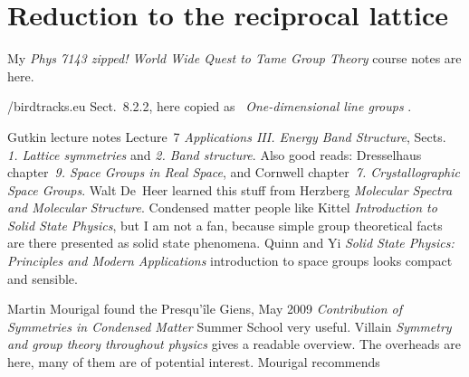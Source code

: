 \section{Reduction to the reciprocal lattice}
\label{sect:RhombCornerFT}

\noindent
My {\em Phys 7143 zipped! World Wide Quest to Tame Group Theory} course notes
 {are here}.

{/birdtracks.eu Sect.~8.2.2},
here copied as ~{\em One-dimensional line groups}
.

Gutkin
 {lecture
notes} Lecture~7 {\em Applications III. Energy Band Structure}, Sects.~{\em
1. Lattice symmetries} and {\em 2. Band structure}. Also good reads:
Dresselhaus \etal{}
chapter~{\em 9. Space Groups in Real Space}, and
Cornwell %
chapter~{\em 7. Crystallographic Space Groups}.
Walt De~Heer learned this stuff from Herzberg {\em Molecular
Spectra and Molecular Structure}. Condensed matter people like
Kittel {\em Introduction to Solid State Physics}, but I am
not a fan, because simple group theoretical facts are there presented as
solid state  phenomena.
Quinn and Yi
{\em Solid State Physics: Principles and Modern Applications}
introduction to space groups looks compact and sensible.

 {Martin Mourigal} found
the Presqu'{\^{i}}le Giens, May 2009 {\em Contribution of Symmetries in Condensed Matter}
Summer School very useful.
Villain
{\em Symmetry and group theory throughout physics} gives a readable overview.
The overheads are
{here}, many of them are of potential interest. Mourigal recommends

